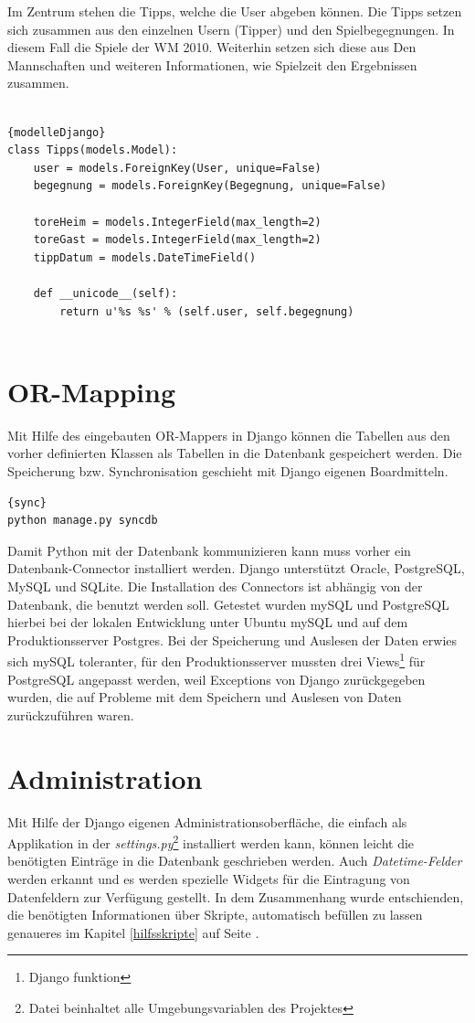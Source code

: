 Im Zentrum stehen die Tipps, welche die User abgeben können. Die Tipps setzen
sich zusammen aus den einzelnen Usern (Tipper) und den Spielbegegnungen. In
diesem Fall die Spiele der WM 2010. Weiterhin setzen sich diese aus Den
Mannschaften und weiteren Informationen, wie Spielzeit den Ergebnissen zusammen.
\\
\\

\begin{lstlisting}[caption=Modelle in Django]{modelleDjango}
class Tipps(models.Model):
    user = models.ForeignKey(User, unique=False)
    begegnung = models.ForeignKey(Begegnung, unique=False)
    
    toreHeim = models.IntegerField(max_length=2)
    toreGast = models.IntegerField(max_length=2)
    tippDatum = models.DateTimeField()
    
    def __unicode__(self):
        return u'%s %s' % (self.user, self.begegnung)
   
\end{lstlisting}

\section{OR-Mapping}
Mit Hilfe des eingebauten OR-Mappers in Django können die Tabellen aus den
vorher definierten Klassen als Tabellen in die Datenbank gespeichert werden.
Die Speicherung bzw. Synchronisation geschieht mit Django eigenen Boardmitteln.

\begin{lstlisting}[caption=Datenbanksynchronisation]{sync}
python manage.py syncdb
\end{lstlisting}

Damit Python mit der Datenbank kommunizieren kann muss vorher ein
Datenbank-Connector installiert werden. Django unterstützt Oracle, PostgreSQL,
MySQL und SQLite. Die Installation des Connectors ist abhängig von der
Datenbank, die benutzt werden soll. Getestet wurden mySQL und PostgreSQL
hierbei bei der lokalen Entwicklung unter Ubuntu mySQL und auf dem
Produktionsserver Postgres. Bei der Speicherung und Auslesen der Daten erwies
sich mySQL toleranter, für den Produktionsserver mussten drei
Views\footnote{Django funktion} für PostgreSQL angepasst werden, weil
Exceptions von Django zurückgegeben wurden, die auf Probleme mit dem Speichern
und Auslesen von Daten zurückzuführen waren.

\section{Administration}
Mit Hilfe der Django eigenen Administrationsoberfläche, die einfach als
Applikation in der \emph{settings.py}\footnote{Datei beinhaltet alle
Umgebungsvariablen des Projektes} installiert werden kann, können leicht die
benötigten Einträge in die Datenbank geschrieben werden. Auch
\emph{Datetime-Felder} werden erkannt und es werden spezielle Widgets für die
Eintragung von Datenfeldern zur Verfügung gestellt. In dem Zusammenhang wurde
entschienden, die benötigten Informationen über Skripte, automatisch befüllen zu
lassen genaueres im Kapitel \ref{hilfsskripte} auf Seite \pageref{hilfsskripte}. 

